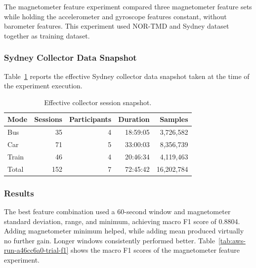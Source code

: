 The magnetometer feature experiment compared three magnetometer feature sets while holding the accelerometer and gyroscope features constant, without barometer features. This experiment used NOR-TMD and Sydney dataset together as training dataset.

\subsubsection{Sydney Collector Data Snapshot}

Table~\ref{tab:aws-run-a46cc6a0-effective-collector-snapshot} reports the effective Sydney collector data snapshot taken at the time of the experiment execution.

\begin{table}[htbp]
\centering
\caption{Effective collector session snapshot.}
\label{tab:aws-run-a46cc6a0-effective-collector-snapshot}
\begin{tabular}{lrrrr}
\hline
\textbf{Mode} & \textbf{Sessions} & \textbf{Participants} & \textbf{Duration} & \textbf{Samples} \\
\hline
Bus & 35 & 4 & 18:59:05 & 3,726,582 \\
Car & 71 & 5 & 33:00:03 & 8,356,739 \\
Train & 46 & 4 & 20:46:34 & 4,119,463 \\
\hline
Total & 152 & 7 & 72:45:42 & 16,202,784 \\
\hline
\end{tabular}
\end{table}

\subsubsection{Results}

The best feature combination used a 60-second window and magnetometer standard deviation, range, and minimum, achieving macro F1 score of 0.8804. Adding magnetometer minimum helped, while adding mean produced virtually no further gain. Longer windows consistently performed better. Table~\ref{tab:aws-run-a46cc6a0-trial-f1} shows the macro F1 scores of the magnetometer feature experiment.

